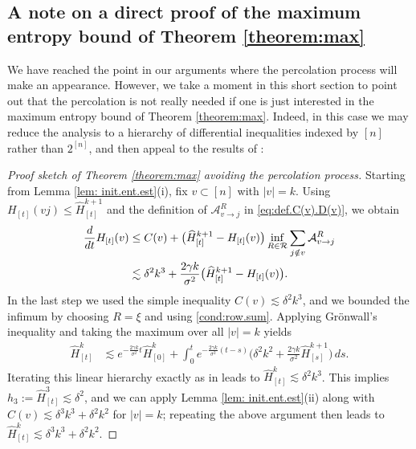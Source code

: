 \documentclass[11pt,reqno]{amsart}
\numberwithin{equation}{section}
\theoremstyle{definition}
\def\CC{{C}}
\def\A{{\mathcal A}}
\begin{document}
	




\subsection{A note on a direct proof of the maximum entropy bound of Theorem \ref{theorem:max}}
We have reached the point in our arguments where the percolation process will make an appearance. However, we take a moment in this short section to point out that the percolation is not really needed if one is just interested in the maximum entropy bound of Theorem \ref{theorem:max}. Indeed, in this case we may reduce the analysis to a hierarchy of differential inequalities indexed by $[n]$ rather than $2^{[n]}$, and then appeal to the results of \cite{lacker2022hierarchies}:



\begin{proof}[Proof sketch of Theorem \ref{theorem:max} avoiding the percolation process]
Starting from Lemma \ref{lem: init.ent.est}(i), fix $v \subset [n]$ with $|v|=k$. Using $H_{[t]}(vj)\le \widehat{H}^{k+1}_{[t]}$ and the definition of $\mathcal{A}^{R}_{v\to j}$ in \eqref{eq:def.C(v).D(v)}, we obtain
		\begin{align*}
			\frac{d}{dt} H_{[t]}(v)
			&\le \CC(v)
			+ \big(\widehat{H}^{k+1}_{[t]} - H_{[t]}(v)\big)
			\inf_{R \in \mathcal{R}} \sum_{j \notin v} \A^{R}_{v\to j}
			\notag\\
			&\lesssim \delta^2 k^3 			+ \frac{2\gamma k}{\sigma^2}\big(\widehat{H}^{k+1}_{[t]} - H_{[t]}(v)\big).
		\end{align*}
		In the last step we used the simple inequality $C(v) \lesssim \delta^2k^3$, and we bounded the infimum by choosing $R = \xi$ and using \eqref{cond:row.sum}. 
		Applying Gr\"{o}nwall's inequality and taking the maximum over all $|v|=k$ yields
		\begin{align*}
			\widehat{H}_{[t]}^{k}
			&\lesssim
			e^{-\frac{2\gamma k}{\sigma^2}t}\widehat{H}_{[0]}^{k}
			+ \int_0^t e^{-\frac{2\gamma k}{\sigma^2}(t-s)}
			\Big( \delta^2k^2 + \frac{2\gamma k}{\sigma^2}\widehat{H}^{k+1}_{[s]} \Big)\,ds.
		\end{align*}
		Iterating this linear hierarchy exactly as in \cite{lacker2022hierarchies} leads to $\widehat{H}_{[t]}^{k} \lesssim \delta^2k^3$. This implies $h_3 := \widehat{H}_{[t]}^3  \lesssim \delta^2$, and we can apply Lemma \ref{lem: init.ent.est}(ii) along with $\widehat{C}(v) \lesssim \delta^3 k^3 + \delta^2 k^2$ for $|v|=k$;  repeating  the above argument then leads to $\widehat{H}_{[t]}^{k} \lesssim \delta^3k^3 + \delta^2k^2$.
\end{proof} 
\end{document}
